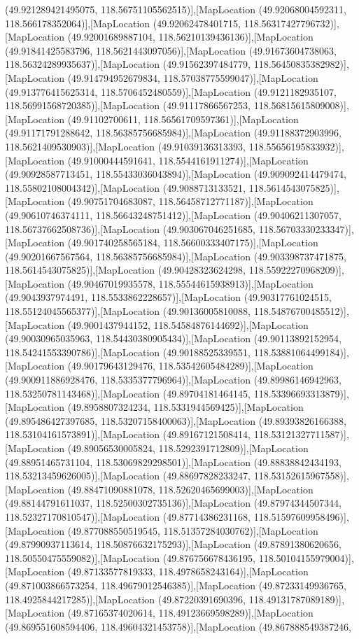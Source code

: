 (49.921289421495075, 118.56751105562515)],[MapLocation (49.92068004592311, 118.566178352064)],[MapLocation (49.92062478401715, 118.56317427796732)],[MapLocation (49.92001689887104, 118.56210139436136)],[MapLocation (49.91841425583796, 118.5621443097056)],[MapLocation (49.91673604738063, 118.56324289935637)],[MapLocation (49.91562397484779, 118.56450835382982)],[MapLocation (49.914794952679834, 118.57038775599047)],[MapLocation (49.913776415625314, 118.5706452480559)],[MapLocation (49.9121182935107, 118.56991568720385)],[MapLocation (49.91117866567253, 118.56815615809008)],[MapLocation (49.91102700611, 118.56561709597361)],[MapLocation (49.91171791288642, 118.56385756685984)],[MapLocation (49.91188372903996, 118.5621409530903)],[MapLocation (49.91039136313393, 118.55656195833932)],[MapLocation (49.91000444591641, 118.5544161911274)],[MapLocation (49.90928587713451, 118.55433036043894)],[MapLocation (49.909092414479474, 118.55802108004342)],[MapLocation (49.9088713133521, 118.5614543075825)],[MapLocation (49.90751704683087, 118.56458712771187)],[MapLocation (49.90610746374111, 118.56643248751412)],[MapLocation (49.90406211307057, 118.56737662508736)],[MapLocation (49.903067046251685, 118.56703330233347)],[MapLocation (49.901740258565184, 118.56600333407175)],[MapLocation (49.90201667567564, 118.56385756685984)],[MapLocation (49.903398737471875, 118.5614543075825)],[MapLocation (49.90428323624298, 118.55922270968209)],[MapLocation (49.90467019935578, 118.55544615938913)],[MapLocation (49.9043937974491, 118.5533862228657)],[MapLocation (49.90317761024515, 118.55124045565377)],[MapLocation (49.90136005810088, 118.54876700485512)],[MapLocation (49.9001437944152, 118.54584876144692)],[MapLocation (49.90030965035963, 118.54430380905434)],[MapLocation (49.90113892152954, 118.54241553390786)],[MapLocation (49.90188525339551, 118.53881064499184)],[MapLocation (49.90179643129476, 118.53542605484289)],[MapLocation (49.900911886928476, 118.5335377796964)],[MapLocation (49.89986146942963, 118.53250781143468)],[MapLocation (49.89704181464145, 118.53396693313879)],[MapLocation (49.8958807324234, 118.5331944569425)],[MapLocation (49.895486427397685, 118.53207158400063)],[MapLocation (49.89393826166388, 118.53104161573891)],[MapLocation (49.89167121508414, 118.53121327711587)],[MapLocation (49.89056530005824, 118.5292391712809)],[MapLocation (49.88951465731104, 118.53069829298501)],[MapLocation (49.88838842434193, 118.53213459626005)],[MapLocation (49.88697828233247, 118.53152615967558)],[MapLocation (49.88471090881078, 118.52620465699003)],[MapLocation (49.88144791611037, 118.52500302735136)],[MapLocation (49.87974344507344, 118.52327170810547)],[MapLocation (49.87714386231168, 118.51597609958496)],[MapLocation (49.877088550519545, 118.51357284030762)],[MapLocation (49.87990937113614, 118.50876632175293)],[MapLocation (49.87891380620656, 118.50550475559082)],[MapLocation (49.876756678436195, 118.50104155979004)],[MapLocation (49.87133577819333, 118.4978658243164)],[MapLocation (49.871003866573254, 118.49679012546385)],[MapLocation (49.87233149936765, 118.4925844217285)],[MapLocation (49.87220391690396, 118.49131787089189)],[MapLocation (49.87165374020614, 118.49123669598289)],[MapLocation (49.869551608594406, 118.49604321453758)],[MapLocation (49.867888549387246, 